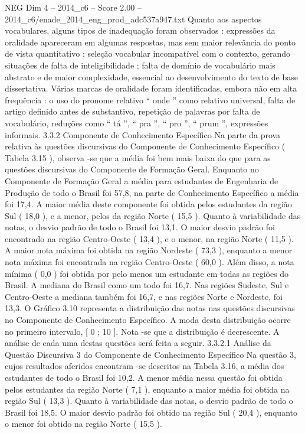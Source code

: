 \begin{textsample}{NEG Dim 4 – 2014\_c6 – Score 2.00 – 2014\_c6/enade\_2014\_eng\_prod\_adc537a947.txt}
Quanto aos aspectos vocabulares, alguns tipos de inadequação foram observados : expressões da oralidade apareceram em algumas respostas, mas sem maior relevância do ponto de vista quantitativo ; seleção vocabular incompatível com o contexto, gerando situações de falta de inteligibilidade ; falta de domínio de vocabulário mais abstrato e de maior complexidade, essencial ao desenvolvimento do texto de base dissertativa.
Várias marcas de oralidade foram identificadas, embora não em alta frequência : o uso do pronome relativo “ onde ” como relativo universal, falta de artigo definido antes de substantivo, repetição de palavras por falta de vocabulário, reduções como “ tá ”, “ pra ”, “ pro ”, “ prum ”, expressões informais. 3.3.2 Componente de Conhecimento Específico Na parte da prova relativa às questões discursivas do Componente de Conhecimento Específico ( Tabela 3.15 ), observa -se que a média foi bem mais baixa do que para as questões discursivas do Componente de Formação Geral.
Enquanto no Componente de Formação Geral a média para estudantes de Engenharia de Produção de todo o Brasil foi 57,8, na parte de Conhecimento Específico a média foi 17,4.
A maior média deste componente foi obtida pelos estudantes da região Sul ( 18,0 ), e a menor, pelos da região Norte ( 15,5 ).
Quanto à variabilidade das notas, o desvio padrão de todo o Brasil foi 13,1.
O maior desvio padrão foi encontrado na região Centro-Oeste ( 13,4 ), e o menor, na região Norte ( 11,5 ).
A maior nota máxima foi obtida na região Nordeste ( 73,3 ), enquanto a menor nota máxima foi encontrada na região Centro-Oeste ( 60,0 ).
Além disso, a nota mínima ( 0,0 ) foi obtida por pelo menos um estudante em todas as regiões do Brasil.
A mediana do Brasil como um todo foi 16,7.
Nas regiões Sudeste, Sul e Centro-Oeste a mediana também foi 16,7, e nas regiões Norte e Nordeste, foi 13,3.
O Gráfico 3.10 representa a distribuição das notas nas questões discursivas no Componente de Conhecimento Específico.
A moda desta distribuição ocorre no primeiro intervalo, [ 0 ; 10 ].
Nota -se que a distribuição é decrescente.
A análise de cada uma destas questões será feita a seguir. 3.3.2.1 Análise da Questão Discursiva 3 do Componente de Conhecimento Específico Na questão 3, cujos resultados aferidos encontram -se descritos na Tabela 3.16, a média dos estudantes de todo o Brasil foi 10,2.
A menor média nessa questão foi obtida pelos estudantes da região Norte ( 7,1 ), enquanto a maior média foi obtida na região Sul ( 13,3 ).
Quanto à variabilidade das notas, o desvio padrão de todo o Brasil foi 18,5.
O maior desvio padrão foi obtido na região Sul ( 20,4 ), enquanto o menor foi obtido na região Norte ( 15,5 ).

\end{textsample}
